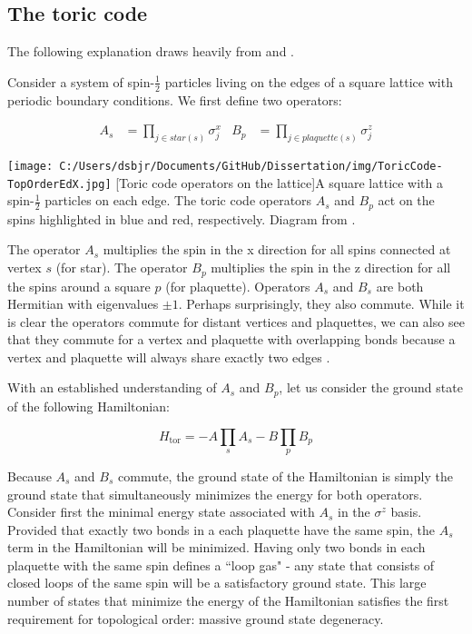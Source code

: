 \subsection{The toric code}

The following explanation draws heavily from \cite{Kitaev2003} and \cite{topOrderEdX}.

Consider a system of spin-$\frac{1}{2}$ particles living on the edges of a square lattice with periodic boundary conditions. We first define two operators:

\begin{align*}
A_s&=\prod_{j \in star(s)} \sigma^{x}_{j} 		& B_{p}&=\prod_{j \in plaquette(s)} \sigma^{z}_{j}
\end{align*}

\begin{centering}
\texttt{[image: C:/Users/dsbjr/Documents/GitHub/Dissertation/img/ToricCode-TopOrderEdX.jpg]}
  \captionsetup{width=0.9\textwidth}
  [Toric code operators on the lattice]{A square lattice with a spin-$\frac{1}{2}$ particles on each edge. The toric code operators $A_{s}$ and $B_{p}$ act on the spins highlighted in blue and red, respectively. Diagram from \cite{topOrderEdX}.}
  \label{fig:toricCode1}
\end{centering}

The operator $A_{s}$ multiplies the spin in the x direction for all spins connected at vertex $s$ (for star). The operator $B_{p}$ multiplies the spin in the z direction for all the spins around a square $p$ (for plaquette). Operators $A_{s}$ and $B_{s}$ are both Hermitian with eigenvalues $\pm 1$. Perhaps surprisingly, they also commute. While it is clear the operators commute for distant vertices and plaquettes, we can also see that they commute for a vertex and plaquette with overlapping bonds because a vertex and plaquette will always share exactly two edges \cite{Kitaev2003}.

With an established understanding of $A_{s}$ and $B_{p}$, let us consider the ground state of the following Hamiltonian:

\begin{equation}
H_{\text{tor}} = -A \prod_{s} A_{s} - B \prod_{p} B_{p}
\end{equation}

Because $A_{s}$ and $B_{s}$ commute, the ground state of the Hamiltonian is simply the ground state that simultaneously minimizes the energy for both operators. Consider first the minimal energy state associated with $A_{s}$ in the $\sigma^{z}$ basis. Provided that exactly two bonds in a each plaquette have the same spin, the $A_{s}$ term in the Hamiltonian will be minimized. Having only two bonds in each plaquette with the same spin defines a ``loop gas" - any state that consists of closed loops of the same spin will be a satisfactory ground state. This large number of states that minimize the energy of the Hamiltonian satisfies the first requirement for topological order: massive ground state degeneracy.

